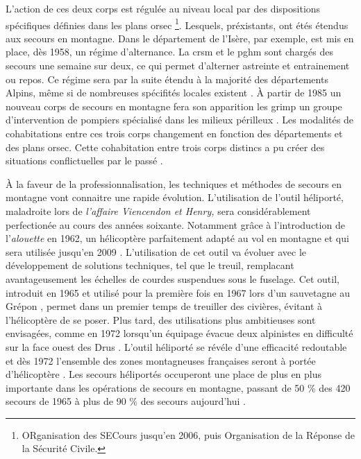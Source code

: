L'action de ces deux corps est régulée au niveau local par des
dispositions spécifiques définies dans les plans \ac{orsec}
\footnote{ORganisation des SECours jusqu'en 2006, puis Organisation de
  la Réponse de la Sécurité Civile.}. Lesquels, préxistants, ont étés
étendus aux secours en montagne. Dans le département de l'Isère, par
exemple, est mis en place, dès 1958, un régime d'alternance. La
\ac{crsm} et le \ac{pghm} sont chargés des secours une semaine sur
deux, ce qui permet d'alterner astreinte et entrainement ou repos. Ce
régime sera par la suite étendu à la majorité des départements Alpins,
même si de nombreuses spécifités locales existent
\autocite{Halle2007}. À partir de 1985 un nouveau corps de secours en
montagne fera son apparition les \ac{grimp} un groupe d'intervention
de pompiers spécialisé dans les milieux périlleux
\autocite{CFDLD}. Les modalités de cohabitations entre ces trois corps
changement en fonction des départements et des plans \ac{orsec}.
Cette cohabitation entre trois corps distincs a pu créer des
situations conflictuelles par le passé \autocite{Soule2002,
  Ganser2012}.

À la faveur de la professionnalisation, les techniques et méthodes de
secours en montagne vont connaitre une rapide évolution. L'utilisation
de l'outil héliporté, maladroite lors de \emph{l'affaire Viencendon et
  Henry,} sera considérablement perfectionée au cours des années
soixante. Notamment grâce à l'introduction de l'\emph{alouette
  } en 1962, un hélicoptère parfaitement adapté au vol en
montagne et qui sera utilisée jusqu'en 2009 \autocite{Elie2006,
  Lafond, Lafond2011b}. L'utilisation de cet outil va évoluer avec le
développement de solutions techniques, tel que le treuil, remplacant
avantageusement les échelles de courdes suspendues sous le
fuselage. Cet outil, introduit en 1965 et utilisé pour la première
fois en 1967 lors d'un sauvetagne au Grépon \autocite{Lafond2011a},
permet dans un premier temps de treuiller des civières, évitant à
l'hélicoptère de se poser. Plus tard, des utilisations plus
ambitieuses sont envisagées, comme en 1972 lorsqu'un équipage évacue
deux alpinistes en difficulté sur la face ouest des Drus
\autocite{Ministere2013}. L'outil héliporté se révéle d'une efficacité
redoutable et dès 1972 l'ensemble des zones montagneuses françaises
seront à portée d'hélicoptère \autocite{CFDLD}. Les secours héliportés
occuperont une place de plus en plus importante dans les opérations de
secours en montagne, passant de 50 \% des 420 secours de 1965
\autocite{CFDLD} à plus de 90 \% des secours aujourd'hui
\autocite{Halle2007}.

